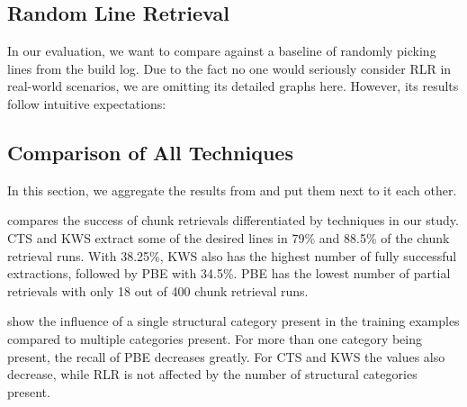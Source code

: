 \subsection{Random Line Retrieval}
\label{sec:r:rlr}

In our evaluation, we want to compare against a baseline of randomly picking lines from the build log. Due to the fact no one would seriously consider RLR in real-world scenarios, we are omitting its detailed graphs here. However, its results follow intuitive expectations:

\subsection{Comparison of All Techniques}
In this section, we aggregate the results from  and put them next to it each other.

 compares the success of chunk retrievals differentiated by techniques in our study.
CTS and KWS extract some of the desired lines in 79\% and 88.5\% of the chunk retrieval runs.
With 38.25\%, KWS also has the highest number of fully successful extractions, followed by PBE with 34.5\%.
PBE has the lowest number of partial retrievals with only 18 out of 400 chunk retrieval runs.


 show the influence of a single structural category present in the training examples compared to multiple categories present.
For more than one category being present, the recall of PBE decreases greatly.
For CTS and KWS the values also decrease, while RLR is not affected by the number of structural categories present.

